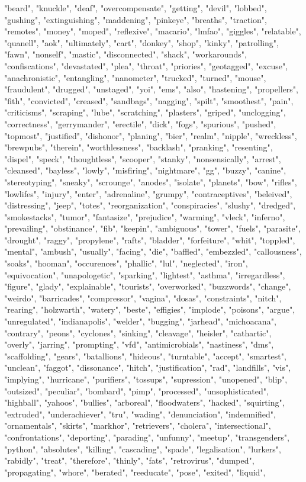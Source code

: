 "beard", "knuckle", "deaf", "overcompensate", "getting", "devil", "lobbed", "gushing", "extinguishing", "maddening", "pinkeye", "breaths", "traction", "remotes", "money", "moped", "reflexive", "macario", "lmfao", "giggles", "relatable", "quanell", "aok", "ultimately", "cart", "donkey", "shop", "kinky", "patrolling", "fawn", "nonself", "mastic", "disconnected", "shack", "workarounds", "confiscations", "devastated", "plea", "throat", "priories", "geotagged", "excuse", "anachronistic", "entangling", "nanometer", "trucked", "turned", "mouse", "fraudulent", "drugged", "unstaged", "yoi", "ems", "also", "hastening", "propellers", "fith", "convicted", "creased", "sandbags", "nagging", "spilt", "smoothest", "pain", "criticisms", "scraping", "lube", "scratching", "plasters", "griped", "unclogging", "correctness", "gerrymander", "erectile", "dick", "fogs", "spurious", "pushed", "topmost", "justified", "dishonor", "planing", "bier", "realm", "nipple", "wreckless", "brewpubs", "therein", "worthlessness", "backlash", "pranking", "resenting", "dispel", "speck", "thoughtless", "scooper", "stanky", "nonsensically", "arrest", "cleansed", "bayless", "lowly", "misfiring", "nightmare", "gg", "buzzy", "canine", "stereotyping", "sneaky", "scrounge", "anodes", "isolate", "planets", "bow", "rifles", "lowlifes", "injury", "enter", "adrenaline", "grumpy", "contraceptives", "beleived", "distressing", "jeep", "totes", "reorganization", "conspiracies", "slushy", "dredged", "smokestacks", "tumor", "fantasize", "prejudice", "warming", "vleck", "inferno", "prevailing", "obstinance", "fib", "keepin", "ambiguous", "tower", "fuels", "parasite", "drought", "raggy", "propylene", "rafts", "bladder", "forfeiture", "whit", "toppled", "mental", "ambush", "usually", "facing", "die", "baffled", "embezzled", "callousness", "soaks", "hooman", "occurences", "phallic", "lul", "neglected", "iron", "equivocation", "unapologetic", "sparking", "lightest", "asthma", "irregardless", "figure", "glady", "explainable", "tourists", "overworked", "buzzwords", "change", "weirdo", "barricades", "compressor", "vagina", "dosas", "constraints", "nitch", "rearing", "holzwarth", "watery", "beste", "effigies", "implode", "poisons", "argue", "unregulated", "indianapolis", "welder", "bugging", "jarhead", "michoacana", "contrary", "peons", "cyclones", "sinking", "cleavage", "heisler", "cathartic", "overly", "jarring", "prompting", "vfd", "antimicrobials", "nastiness", "dms", "scaffolding", "gears", "batallions", "hideous", "turntable", "accept", "smartest", "unclean", "faggot", "dissonance", "hitch", "justification", "rad", "landfills", "vis", "implying", "hurricane", "purifiers", "tossups", "supression", "unopened", "blip", "outsized", "peculiar", "bombard", "pimp", "processed", "unsophisticated", "highball", "yahoos", "bullies", "arboreal", "floodwaters", "hacked", "squirting", "extruded", "underachiever", "tru", "wading", "denunciation", "indemnified", "ornamentals", "skirts", "markhor", "retrievers", "cholera", "intersectional", "confrontations", "deporting", "parading", "unfunny", "meetup", "transgenders", "python", "absolutes", "killing", "cascading", "spade", "legalisation", "lurkers", "rabidly", "treat", "therefore", "thinly", "fats", "retrovirus", "dumped", "propagating", "whore", "berated", "reeducate", "pose", "exited", "liquid", 